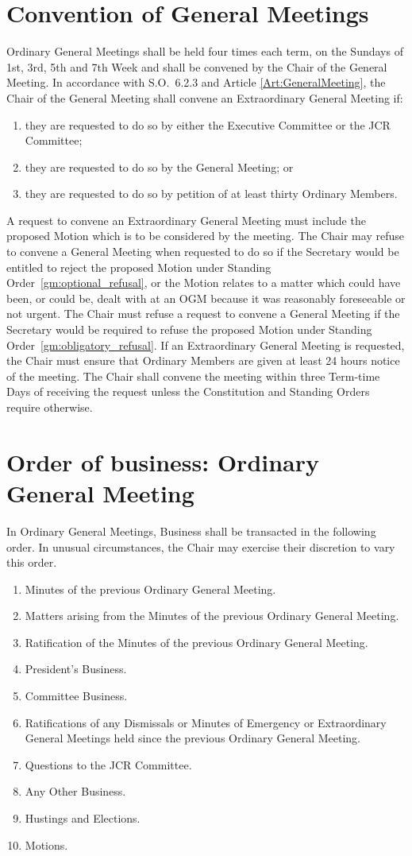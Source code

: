 \section{Convention of General Meetings}
\npara Ordinary General Meetings shall be held four times each term, on the Sundays of 1st, 3rd, 5th and 7th Week and shall be convened by the Chair of the General Meeting.
\npara In accordance with S.O.~6.2.3 and Article \ref{Art:GeneralMeeting}, the Chair of the General Meeting shall convene an Extraordinary General Meeting if:
\begin{enumerate}
\item they are requested to do so by either the Executive Committee or the JCR Committee;
\item they are requested to do so by the General Meeting; or
\item they are requested to do so by petition of at least thirty Ordinary Members.
\end{enumerate}
\npara A request to convene an Extraordinary General Meeting must include the proposed Motion which is to be considered by the meeting.  The Chair may refuse to convene a General Meeting when requested to do so if the Secretary would be entitled to reject the proposed Motion under Standing Order~\ref{gm:optional_refusal}, or the Motion relates to a matter which could have been, or could be, dealt with at an OGM because it was reasonably foreseeable or not urgent. The Chair must refuse a request to convene a General Meeting if the Secretary would be required to refuse the proposed Motion under Standing Order~\ref{gm:obligatory_refusal}.
\npara If an Extraordinary General Meeting is requested, the Chair must ensure that Ordinary Members are given at least 24 hours notice of the meeting.  The Chair shall convene the meeting within three Term-time Days of receiving the request unless the Constitution and Standing Orders require otherwise.
\section{Order of business: Ordinary General Meeting}
\npara In Ordinary General Meetings, Business shall be transacted in the following order.  In unusual circumstances, the Chair may exercise their discretion to vary this order.
\begin{enumerate}
\item Minutes of the previous Ordinary General Meeting.
\item Matters arising from the Minutes of the previous Ordinary General Meeting.
\item Ratification of the Minutes of the previous Ordinary General Meeting.
\item President's Business.
\item Committee Business.
\item Ratifications of any Dismissals or Minutes of Emergency or Extraordinary General Meetings held since the previous Ordinary General Meeting.
\item Questions to the JCR Committee.
\item Any Other Business.
\item Hustings and Elections.
\item Motions.
\end{enumerate}

